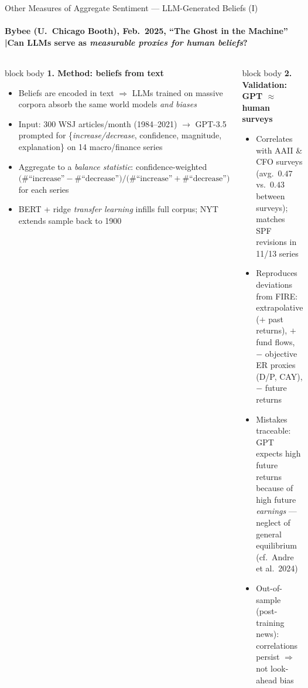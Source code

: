 \documentclass[aspectratio=169, 11pt]{beamer}
\begin{document}
\begin{frame}[shrink=5]{Other Measures of Aggregate Sentiment --- LLM-Generated Beliefs (I)}
\framesubtitle{\footnotesize Bybee (U.\ Chicago Booth), Feb.\ 2025, ``The Ghost in the Machine'' \quad|\quad Can LLMs serve as \emph{measurable proxies for human beliefs}?}

\vspace{-0.2em}
\begin{columns}[T,onlytextwidth]
\begin{beamercolorbox}[rounded=true,sep=4pt]{block body}
\color{CityUBlue}\textbf{\small 1. Method: beliefs from text}
\begin{itemize}\setlength{\itemsep}{1pt}\footnotesize
  \item Beliefs are encoded in text $\Rightarrow$ LLMs trained on massive corpora absorb the same world models \emph{and biases}
  \item Input: 300 WSJ articles/month (1984--2021) $\to$ GPT-3.5 prompted for \{\emph{increase/decrease}, confidence, magnitude, explanation\} on 14 macro/finance series
  \item Aggregate to a \emph{balance statistic}: confidence-weighted $\big(\#\text{``increase''} - \#\text{``decrease''}\big) \big/ \big(\#\text{``increase''} + \#\text{``decrease''}\big)$ for each series
  \item BERT + ridge \emph{transfer learning} infills full corpus; NYT extends sample back to 1900
\end{itemize}
\end{beamercolorbox}

\begin{beamercolorbox}[rounded=true,sep=4pt]{block body}
\color{CityUBlue}\textbf{\small 2. Validation: GPT $\approx$ human surveys}
\begin{itemize}\setlength{\itemsep}{1pt}\footnotesize
  \item Correlates with AAII \& CFO surveys (avg.\ $0.47$ vs.\ $0.43$ between surveys); matches SPF revisions in 11/13 series
  \item Reproduces \textcolor{cinnabar}{deviations from FIRE}: extrapolative ($+$ past returns), $+$ fund flows, $-$ objective ER proxies (D/P, CAY), \textcolor{cinnabar}{$-$ future returns}
  \item Mistakes traceable: GPT expects high future returns because of high future \emph{earnings} --- \textcolor{cinnabar}{neglect of general equilibrium} (cf.\ Andre et al.\ 2024)
  \item Out-of-sample (post-training news): correlations persist $\Rightarrow$ not look-ahead bias
\end{itemize}
\end{beamercolorbox}
\end{columns}
\end{frame}
\end{document}
